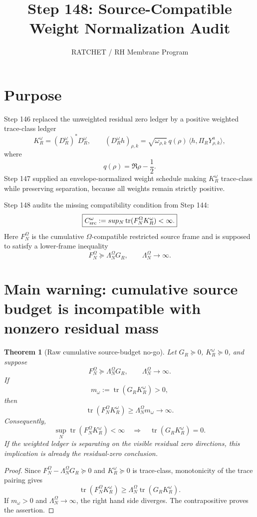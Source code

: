 \documentclass[11pt]{article}
\title{Step 148: Source-Compatible Weight Normalization Audit}
\author{RATCHET / RH Membrane Program}
\date{}
\newtheorem{theorem}{Theorem}
\begin{document}
\maketitle

\section{Purpose}
Step 146 replaced the unweighted residual zero ledger by a positive weighted trace-class ledger
\[
K_R^\omega=(D_R^\omega)^*D_R^\omega,
\qquad
(D_R^\omega h)_{\rho,k}=\sqrt{\omega_{\rho,k}}\,q(\rho)\,\langle h,\Pi_RY^a_{\rho,k}\rangle,
\]
where
\[
q(\rho)=\Re\rho-\frac12.
\]
Step 147 supplied an envelope-normalized weight schedule making \(K_R^\omega\) trace-class while preserving separation, because all weights remain strictly positive.

Step 148 audits the missing compatibility condition from Step 144:
\[
\boxed{
C_{\rm src}^{\omega}:=\\sup_N\operatorname{tr}(F_N^\Omega K_R^\omega)<\infty.
}
\]
Here \(F_N^\Omega\) is the cumulative \(\Omega\)-compatible restricted source frame and is supposed to satisfy a lower-frame inequality
\[
\boxed{
F_N^\Omega\succeq \Lambda_N^\Omega G_R,
\qquad
\Lambda_N^\Omega\to\infty.
}
\]

\section{Main warning: cumulative source budget is incompatible with nonzero residual mass}

\begin{theorem}[Raw cumulative source-budget no-go]
Let \(G_R\succeq0\), \(K_R^\omega\succeq0\), and suppose
\[
F_N^\Omega\succeq \Lambda_N^\Omega G_R,
\qquad
\Lambda_N^\Omega\to\infty.
\]
If
\[
m_\omega:=\operatorname{tr}(G_RK_R^\omega)>0,
\]
then
\[
\operatorname{tr}(F_N^\Omega K_R^\omega)
\ge
\Lambda_N^\Omega m_\omega
\to\infty.
\]
Consequently,
\[
\boxed{
\sup_N\operatorname{tr}(F_N^\Omega K_R^\omega)<\infty
\quad\Longrightarrow\quad
\operatorname{tr}(G_RK_R^\omega)=0.
}
\]
If the weighted ledger is separating on the visible residual zero directions, this implication is already the residual-zero conclusion.
\end{theorem}

\begin{proof}
Since \(F_N^\Omega-\Lambda_N^\Omega G_R\succeq0\) and \(K_R^\omega\succeq0\) is trace-class, monotonicity of the trace pairing gives
\[
\operatorname{tr}(F_N^\Omega K_R^\omega)
\ge
\Lambda_N^\Omega\operatorname{tr}(G_RK_R^\omega).
\]
If \(m_\omega>0\) and \(\Lambda_N^\Omega\to\infty\), the right hand side diverges. The contrapositive proves the assertion.
\end{proof}
\end{document}
